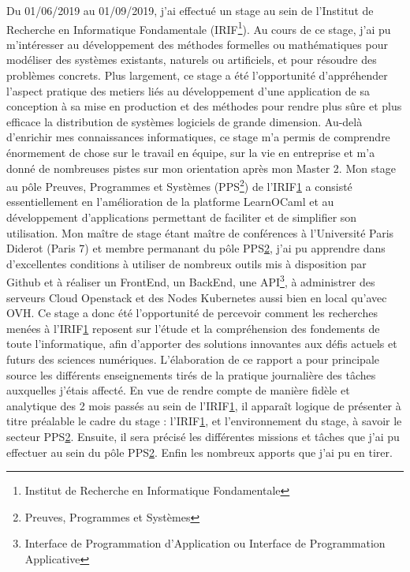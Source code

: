 \documentclass{article}
\begin{document}
Du 01/06/2019 au 01/09/2019, j’ai effectué un stage au sein de l'Institut de Recherche en Informatique Fondamentale (IRIF\footnote{\label{IRIF} Institut de Recherche en Informatique Fondamentale}). Au cours de ce stage, j’ai pu m’intéresser au développement des méthodes formelles ou mathématiques pour modéliser des systèmes existants, naturels ou artificiels, et pour résoudre des problèmes concrets.
Plus largement, ce stage a été l’opportunité d’appréhender l'aspect pratique des metiers liés au développement d'une application de sa conception à sa mise en production et des méthodes pour rendre plus sûre et plus efficace la distribution de systèmes logiciels de grande dimension.
\newline\newline
Au-delà d’enrichir mes connaissances informatiques, ce stage m’a permis de comprendre énormement de chose sur le travail en équipe, sur la vie en entreprise et m'a donné de nombreuses pistes sur mon orientation après mon Master 2.
Mon stage au pôle Preuves, Programmes et Systèmes (PPS\footnote{\label{PPS} Preuves, Programmes et Systèmes}) de l'IRIF\ref{IRIF} a consisté essentiellement en l'amélioration de la platforme LearnOCaml et au développement d'applications permettant de faciliter et de simplifier son utilisation.
Mon maître de stage étant maître de conférences à l'Université Paris Diderot (Paris 7) et membre permanant du pôle PPS\ref{PPS}, j’ai pu apprendre dans d’excellentes conditions à utiliser de nombreux outils mis à disposition par Github et à réaliser un FrontEnd, un BackEnd, une API\footnote{\label{API} Interface de Programmation d’Application ou Interface de Programmation Applicative}, à administrer des serveurs Cloud Openstack et des Nodes Kubernetes aussi bien en local qu'avec OVH.
\newline\newline
Ce stage a donc été l'opportunité de percevoir comment les recherches menées à l'IRIF\ref{IRIF} reposent sur l’étude et la compréhension des fondements de toute l’informatique, afin d’apporter des solutions innovantes aux défis actuels et futurs des sciences numériques.
L’élaboration de ce rapport a pour principale source les différents enseignements tirés de la pratique journalière des tâches auxquelles j’étais affecté.
\newline\newline
En vue de rendre compte de manière fidèle et analytique des 2 mois passés au sein de l'IRIF\ref{IRIF}, il apparaît logique de présenter à titre préalable le cadre du stage : l'IRIF\ref{IRIF}, et l’environnement du stage, à savoir le secteur PPS\ref{PPS}. Ensuite, il sera précisé les différentes missions et tâches que j’ai pu effectuer au sein du pôle PPS\ref{PPS}. Enfin les nombreux apports que j’ai pu en tirer.
\end{document}
